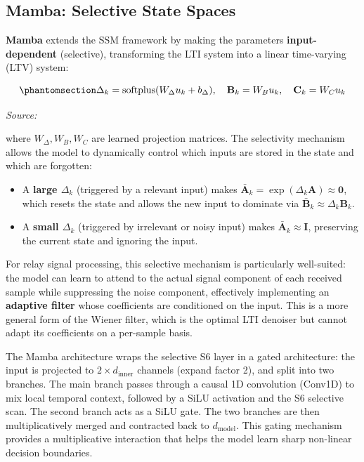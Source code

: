 \subsection{Mamba: Selective State Spaces}\label{sec:mamba-selective-state-spaces}

\textbf{Mamba} \cite{gu2024mamba} extends the SSM framework by making the parameters \textbf{input-dependent} (selective), transforming the LTI system into a linear time-varying (LTV) system:

\begin{equation}\protect\phantomsection\label{eq:mamba-selective}{\Delta_k = \text{softplus}(W_\Delta u_k + b_\Delta), \quad \mathbf{B}_k = W_B u_k, \quad \mathbf{C}_k = W_C u_k
}\end{equation} \par{\small\textit{Source: \cite{gu2024mamba}}}

where \(W_\Delta, W_B, W_C\) are learned projection matrices. The selectivity mechanism allows the model to dynamically control which inputs are stored in the state and which are forgotten:

\begin{itemize}
\tightlist
\item
  A \textbf{large \(\Delta_k\)} (triggered by a relevant input) makes \(\bar{\mathbf{A}}_k = \exp(\Delta_k \mathbf{A}) \approx \mathbf{0}\), which resets the state and allows the new input to dominate via \(\bar{\mathbf{B}}_k \approx \Delta_k \mathbf{B}_k\).
\item
  A \textbf{small \(\Delta_k\)} (triggered by irrelevant or noisy input) makes \(\bar{\mathbf{A}}_k \approx \mathbf{I}\), preserving the current state and ignoring the input.
\end{itemize}

For relay signal processing, this selective mechanism is particularly well-suited: the model can learn to attend to the actual signal component of each received sample while suppressing the noise component, effectively implementing an \textbf{adaptive filter} whose coefficients are conditioned on the input. This is a more general form of the Wiener filter, which is the optimal LTI denoiser but cannot adapt its coefficients on a per-sample basis.

The Mamba architecture wraps the selective S6 layer in a gated architecture: the input is projected to \(2 \times d_{\text{inner}}\) channels (expand factor 2), and split into two branches. The main branch passes through a causal 1D convolution (Conv1D) to mix local temporal context, followed by a SiLU activation and the S6 selective scan. The second branch acts as a SiLU gate. The two branches are then multiplicatively merged and contracted back to \(d_{\text{model}}\). This gating mechanism provides a multiplicative interaction that helps the model learn sharp non-linear decision boundaries.

